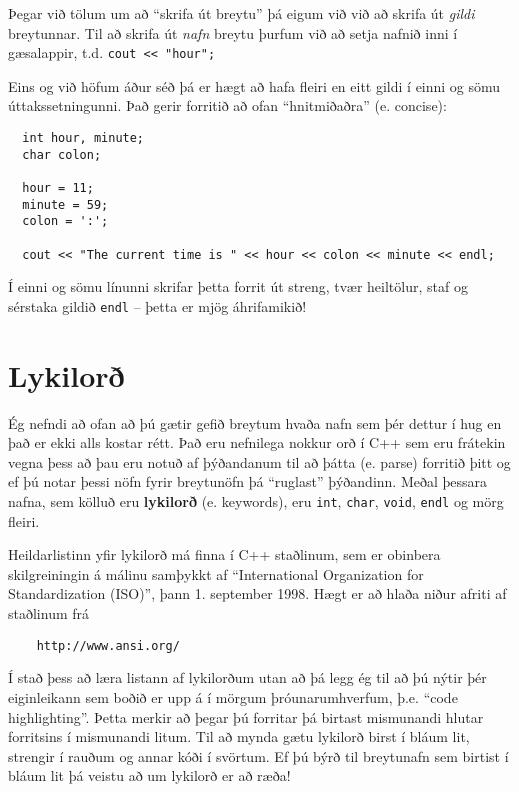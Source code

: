 Þegar við tölum um að ``skrifa út breytu'' þá eigum við við að skrifa út 
{\em gildi} breytunnar.
Til að skrifa út {\em nafn} breytu þurfum við að setja nafnið inni í gæsalappir, t.d. {\tt cout << "hour";}

Eins og við höfum áður séð þá er hægt að hafa fleiri en eitt gildi í einni og sömu úttakssetningunni.
Það gerir forritið að ofan ``hnitmiðaðra'' (e. concise):

\begin{verbatim}
  int hour, minute;
  char colon;

  hour = 11;
  minute = 59;
  colon = ':';

  cout << "The current time is " << hour << colon << minute << endl;
\end{verbatim}
%
Í einni og sömu línunni skrifar þetta forrit út streng, tvær heiltölur, staf og sérstaka gildið {\tt endl} -- þetta er mjög áhrifamikið!

\section{Lykilorð}

Ég nefndi að ofan að þú gætir gefið breytum hvaða nafn sem þér dettur í hug en það er ekki alls kostar rétt.
Það eru nefnilega nokkur orð í C++ sem eru frátekin vegna þess að þau eru notuð af þýðandanum til að þátta (e. parse) forritið þitt og ef þú notar þessi nöfn fyrir breytunöfn þá ``ruglast'' þýðandinn.
Meðal þessara nafna, sem kölluð eru {\bf lykilorð} (e. keywords), eru {\tt int},
{\tt char}, {\tt void}, {\tt endl} og mörg fleiri.

Heildarlistinn yfir lykilorð má finna í C++ staðlinum, sem er obinbera skilgreiningin á málinu samþykkt af 
``International Organization for Standardization (ISO)'', þann 1. september 1998.
Hægt er að hlaða niður afriti af staðlinum frá 
\begin{verbatim}
    http://www.ansi.org/
\end{verbatim}
%
Í stað þess að læra listann af lykilorðum utan að þá legg ég til að þú nýtir þér eiginleikann sem boðið er upp á í mörgum þróunarumhverfum, þ.e. ``code highlighting''.
Þetta merkir að þegar þú forritar þá birtast mismunandi hlutar forritsins í mismunandi litum.
Til að mynda gætu lykilorð birst í bláum lit, strengir í rauðum og annar kóði í svörtum.
Ef þú býrð til breytunafn sem birtist í bláum lit þá veistu að um lykilorð er að ræða!

